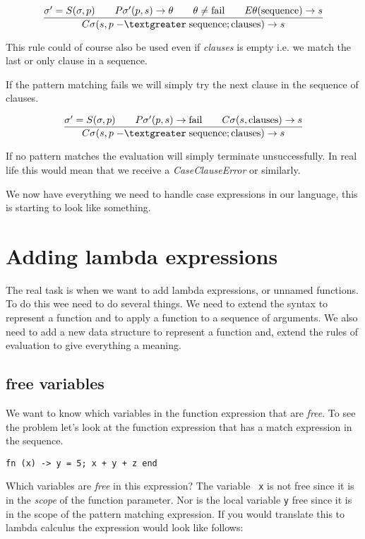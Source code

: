 \documentclass[a4paper,11pt]{article}
\begin{document}
$$\frac{
  \sigma' = S(\sigma, p) \qquad
  P\sigma'(p, s) \rightarrow \theta \qquad
  \theta \not = {\rm fail} \qquad
  E\theta({\rm sequence}) \rightarrow s}{
C\sigma(s, p \;{\rm -\textgreater}\;    {\rm sequence} ; {\rm clauses}) \rightarrow s}$$

This rule could of course also be used even if {\em clauses} is empty
i.e. we match the last or only clause in a sequence.

If the pattern matching fails we will simply try the next clause in
the sequence of clauses.

$$\frac{
  \sigma' = S(\sigma, p) \qquad
  P\sigma'(p, s) \rightarrow {\rm fail} \qquad
  C\sigma(s, {\rm clauses}) \rightarrow s}{
C\sigma(s, p \;{\rm -\textgreater}\;  {\rm sequence} ; {\rm clauses}) \rightarrow s}$$

If no pattern matches the evaluation will simply terminate
unsuccessfully. In real life this would mean that we receive a {\em
  CaseClauseError} or similarly.

We now have everything we need to handle case expressions in our
language, this is starting to look like something.

\section{Adding lambda expressions}

The real task is when we want to add lambda expressions, or unnamed
functions. To do this wee need to do several things. We need to extend
the syntax to represent a function and to apply a function to a
sequence of arguments. We also need to add a new data structure to
represent a function and, extend the rules of evaluation to give
everything a meaning.


\subsection{free variables}

We want to know which variables in the function expression that are
{\em free}. To see the problem let's look at the function expression
that has a match expression in the sequence.

\begin{verbatim}
fn (x) -> y = 5; x + y + z end
\end{verbatim}

Which variables are {\em free} in this expression? The variable {\tt
  x} is not free since it is in the {\em scope} of the function
parameter. Nor is the local variable {\tt y} free since it is in the
scope of the pattern matching expression. If you would
translate this to lambda calculus the expression would look like
follows:
\end{document}
